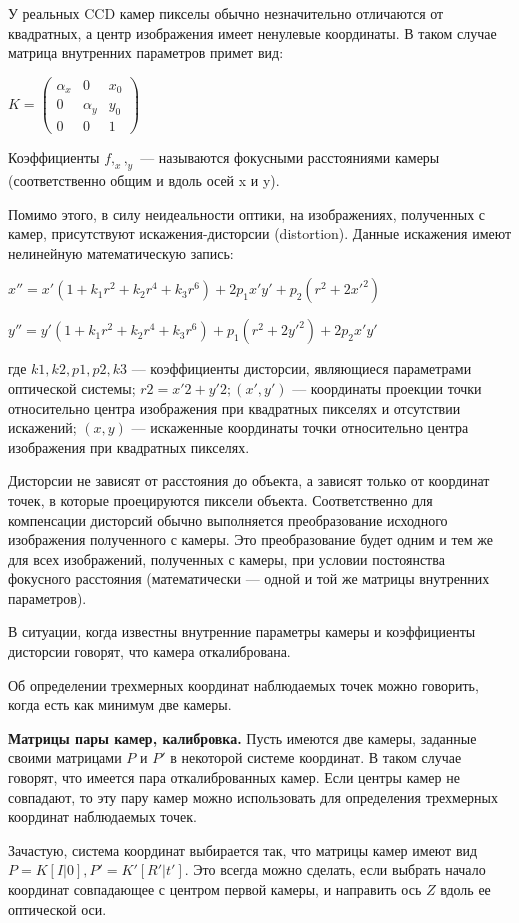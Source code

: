 У реальных CCD камер пикселы обычно незначительно отличаются от квадратных, а центр изображения имеет ненулевые координаты. В таком случае матрица внутренних параметров примет вид: 

$K = \begin{pmatrix}
	\alpha_x & 0 & x_0\\
	0 & \alpha_y & y_0\\
	0 & 0 & 1
\end{pmatrix}$

Коэффициенты $f, _x, _y$ — называются фокусными расстояниями камеры (соответственно общим и вдоль осей x и y).

Помимо этого, в силу неидеальности оптики, на изображениях, полученных с камер, присутствуют искажения-дисторсии (distortion). Данные искажения имеют нелинейную математическую запись:

$x''=x'(1+k_1r^2+k_2r^4+k_3r^6)+2p_1x'y'+p_2(r^2+2x'^2)$

$y''=y'(1+k_1r^2+k_2r^4+k_3r^6)+p_1(r^2+2y'^2)+2p_2x'y'$

где $k1, k2, p1, p2, k3$ — коэффициенты дисторсии, являющиеся параметрами оптической системы; $r2 = x'2 + y'2; (x', y')$ — координаты проекции точки относительно центра изображения при квадратных пикселях и отсутствии искажений; $(x, y)$ — искаженные координаты точки относительно центра изображения при квадратных пикселях.

Дисторсии не зависят от расстояния до объекта, а зависят только от координат точек, в которые проецируются пиксели объекта. Соответственно для компенсации дисторсий обычно выполняется преобразование исходного изображения полученного с камеры. Это преобразование будет одним и тем же для всех изображений, полученных с камеры, при условии постоянства фокусного расстояния (математически — одной и той же матрицы внутренних параметров).

В ситуации, когда известны внутренние параметры камеры и коэффициенты дисторсии говорят, что камера откалибрована.

Об определении трехмерных координат наблюдаемых точек можно говорить, когда есть как минимум две камеры.

\textbf{Матрицы пары камер, калибровка.} Пусть имеются две камеры, заданные своими матрицами $P$ и $P'$ в некоторой системе координат. В таком случае говорят, что имеется пара откалиброванных камер. Если центры камер не совпадают, то эту пару камер можно использовать для определения трехмерных координат наблюдаемых точек.

Зачастую, система координат выбирается так, что матрицы камер имеют вид $P = K[I|0], P' = K'[R'|t']$. Это всегда можно сделать, если выбрать начало координат совпадающее с центром первой камеры, и направить ось $Z$ вдоль ее оптической оси.

